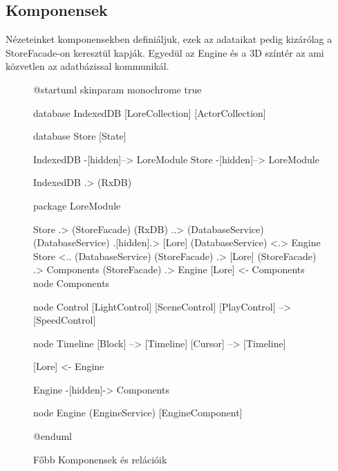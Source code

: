 \subsection{Komponensek}

Nézeteinket komponensekben definiáljuk, ezek az adataikat pedig kizárólag a StoreFacade-on keresztül kapják. Egyedül az Engine és a 3D színtér az ami közvetlen az adatbázissal kommunikál.

\begin{figure}[h!]
	\centering
	\begin{plantuml}
		@startuml
		skinparam monochrome true

		database IndexedDB {
			[LoreCollection]
			[ActorCollection]
		}

		database Store {
			[State]
		}

		IndexedDB -[hidden]--> LoreModule
		Store -[hidden]--> LoreModule

		IndexedDB .> (RxDB)


		package LoreModule {
			Store .> (StoreFacade)
			(RxDB) ..> (DatabaseService)
			(DatabaseService) .[hidden].> [Lore]
			(DatabaseService) <.> Engine
			Store <.. (DatabaseService)
			(StoreFacade) .> [Lore]
			(StoreFacade) .> Components
			(StoreFacade) .> Engine
			[Lore] <- Components
			node Components {

				node Control {
					[LightControl]
					[SceneControl]
					[PlayControl] --> [SpeedControl]
				}


				node Timeline {
					[Block] --> [Timeline]
					[Cursor] --> [Timeline]
				}
			}

			[Lore] <- Engine

			Engine -[hidden]-> Components

			node Engine {
				(EngineService)
				[EngineComponent]
			}


		}


		@enduml
	\end{plantuml}
	\caption{Főbb Komponensek és relációik}
	\label{fig:services-and-components}
\end{figure}


